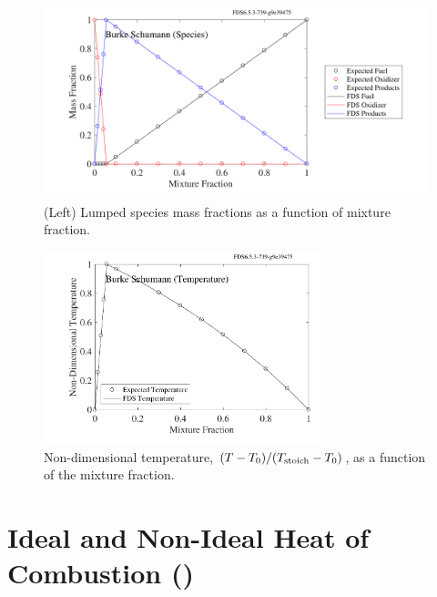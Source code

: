 \documentclass[11pt]{book}
\begin{document}
\begin{figure}[!ht]
\centering
\includegraphics[height=2.2in]{SCRIPT_FIGURES/burke_schumann_spec}
\caption[Mixture fraction state relations for species ()]{(Left) Lumped species mass fractions as a function of mixture fraction.}
\label{fig:burke_schumann_spec}
\end{figure}

\begin{figure}[!ht]
\centering
\includegraphics[height=2.2in]{SCRIPT_FIGURES/burke_schumann_temp}
\caption[Mixture fraction state relations for temperature ()]{Non-dimensional temperature, $(T-T_0)/(T_{\rm stoich} - T_0)$, as a function of the mixture fraction.}
\label{fig:burke_schumann_temp}
\end{figure}


\section{Ideal and Non-Ideal Heat of Combustion ()}
\label{HoC}
\label{HoC_Ideal}
\label{HoC_NonIdeal}
\end{document}
